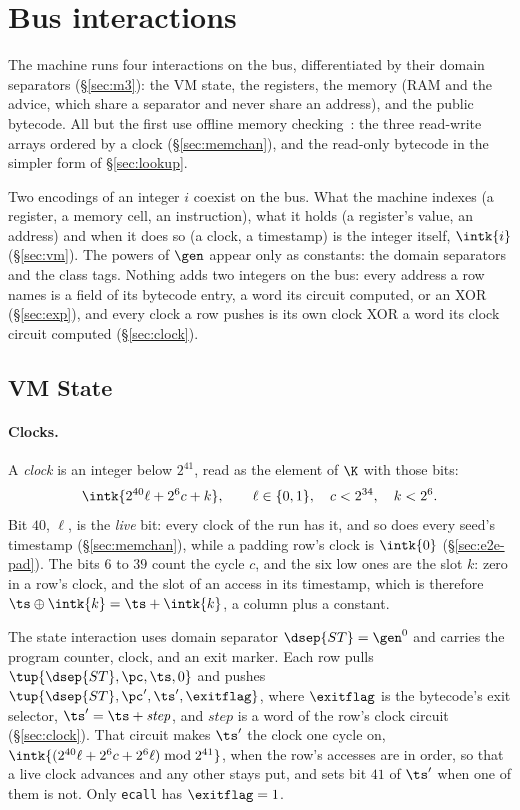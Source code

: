 \section{Bus interactions}\label{sec:omc}

The machine runs four interactions on the bus, differentiated by their domain separators (\S\ref{sec:m3}): the VM state, the registers, the memory (RAM and the advice, which share a separator and never share an address), and the public bytecode. All but the first use offline memory checking~\cite{BEGKN94}: the three read-write arrays ordered by a clock (\S\ref{sec:memchan}), and the read-only bytecode in the simpler form of \S\ref{sec:lookup}.

Two encodings of an integer $i$ coexist on the bus. What the machine indexes (a register, a memory cell, an instruction), what it holds (a register's value, an address) and when it does so (a clock, a timestamp) is the integer itself, $\intk{i}$ (\S\ref{sec:vm}). The powers of $\gen$ appear only as constants: the domain separators and the class tags. Nothing adds two integers on the bus: every address a row names is a field of its bytecode entry, a word its circuit computed, or an XOR (\S\ref{sec:exp}), and every clock a row pushes is its own clock XOR a word its clock circuit computed (\S\ref{sec:clock}).

\subsection{VM State}\label{sec:state}

\paragraph{Clocks.} A \emph{clock} is an integer below $2^{41}$, read as the element of $\K$ with those bits:
\[
  \intk{2^{40}\ell+2^{6}c+k},\qquad \ell\in\{0,1\},\quad c<2^{34},\quad k<2^{6}.
\]
Bit $40$, $\ell$, is the \emph{live} bit: every clock of the run has it, and so does every seed's timestamp (\S\ref{sec:memchan}), while a padding row's clock is $\intk{0}$ (\S\ref{sec:e2e-pad}). The bits $6$ to $39$ count the cycle $c$, and the six low ones are the slot $k$: zero in a row's clock, and the slot of an access in its timestamp, which is therefore $\ts\oplus\intk{k}=\ts+\intk{k}$, a column plus a constant.

The state interaction uses domain separator $\dsep{ST} = \gen^{0}$ and carries the program counter, clock, and an exit marker. Each row pulls $\tup{\dsep{ST},\pc,\ts,0}$ and pushes $\tup{\dsep{ST},\pc',\ts',\exitflag}$, where $\exitflag$ is the bytecode's exit selector, $\ts'=\ts+\mathit{step}$, and $\mathit{step}$ is a word of the row's clock circuit (\S\ref{sec:clock}). That circuit makes $\ts'$ the clock one cycle on, $\intk{(2^{40}\ell+2^{6}c+2^{6}\ell)\bmod2^{41}}$, when the row's accesses are in order, so that a live clock advances and any other stays put, and sets bit $41$ of $\ts'$ when one of them is not. Only \texttt{ecall} has $\exitflag=1$.

